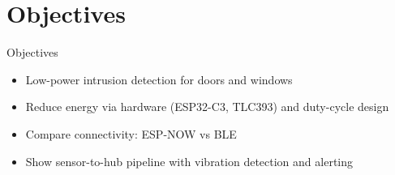 \section{Objectives}

\begin{frame}{Objectives}
  \begin{itemize}
    \item Low-power intrusion detection for doors and windows
    \item Reduce energy via hardware (ESP32-C3, TLC393) and duty-cycle design
    \item Compare connectivity: ESP-NOW vs BLE
    \item Show sensor-to-hub pipeline with vibration detection and alerting
  \end{itemize}
\end{frame}